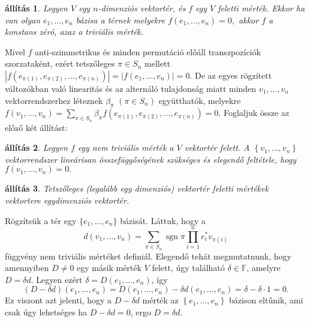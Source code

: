 \documentclass[9pt, a4paper, showtrims]{memoir}
\makeatletter
\renewenvironment{proof}[1][\proofname]
    {\par\pushQED{\qed}%
    \normalfont \topsep6\p@\@plus6\p@\relax
    \trivlist
    \item[\hskip\labelsep
        \itshape
    #1\@addpunct{:}]\ignorespaces}
    {\popQED\endtrivlist\@endpefalse}
\theoremstyle{plain}
\newtheorem{proposition}{állítás}[chapter]
\theoremstyle{remark}
\theoremstyle{definition}
\DeclareMathOperator{\sgn}{sgn}
\makeatother
\begin{document}
\begin{proposition}
	Legyen $V$ egy $n$-dimenziós vektortér, és $f$ egy $V$ feletti mérték.
	Ekkor ha van olyan $e_{1},\ldots ,e_{n}$ bázisa a térnek melyekre
	\(
	f\left( e_{1},\ldots ,e_{n}\right)
	=
	0,
	\)
	akkor $f$ a konstans zéró, azaz a triviális mérték.
\end{proposition}
\begin{proof}
	Mivel $f$ anti-szimmetrikus és minden permutáció előáll transzpozíciók szorzataként,
	ezért tetszőleges $\pi \in S_{n}$ mellett
	$\left| f\left(e_{\pi \left( 1\right) },e_{\pi \left( 2\right) },\ldots ,e_{\pi \left(n\right) }\right) \right|
		=
		\left| f\left( e_{1},\ldots ,e_{n}\right) \right|
		=
		0.
	$
	De az egyes rögzített változókban való linearitás és az alternáló tulajdonság miatt minden
	$v_{1},\ldots ,v_{n}$ vektorrendszerhez léteznek
	$\beta _{\pi }$ $\left( \pi \in S_{n}\right) $ együtthatók,
	melyekre
	$f\left(v_{1},\ldots ,v_{n}\right)
		=
		\sum_{\pi \in S_{n}}\beta _{\pi }f\left( e_{\pi\left( 1\right) },e_{\pi \left( 2\right) },\ldots ,e_{\pi \left( n\right)}\right)
		=
		0.$
\end{proof}
Foglaljuk össze az előző két állítást:
\begin{proposition}
	Legyen $f$ egy nem triviális mérték a $V$ vektortér felett. A
	\begin{math}
		\left\{ v_1,\ldots,v_n \right\}
	\end{math}
	vektorrendszer lineárisan összefüggőségének szükséges és elegendő feltétele,
	hogy
	\begin{math}
		f\left( v_1,\ldots,v_n \right)
		=
		0.
	\end{math}
\end{proposition}

\begin{proposition}
	Tetszőleges (legalább egy dimenziós) vektortér feletti mértékek vektortere egydimenziós vektortér.
\end{proposition}
\begin{proof}
	Rögzítsük a tér egy $\{e_{1},\ldots ,e_{n}\}$ bázisát.
	Láttuk, hogy a
	\[
		d\left(v_{1},\ldots ,v_{n}\right)
		=
		\sum_{\pi \in S_{n}}\sgn\pi\prod_{i=1}^ne_i^\ast v_{\pi\left( i\right)}
	\]
	függvény nem triviális mértéket definiál.
	Elegendő tehát megmutatnunk,
	hogy amennyiben $D\neq 0$ egy másik mérték $V$ felett,
	úgy található
	$\delta\in \mathbb{F}$,
	amelyre
	$D=\delta d.$
	Legyen ezért
	$\delta
		=
		D\left( e_{1},\ldots,e_{n}\right)
	$,
	így
	\[
		\left( D-\delta d \right)\left( e_1,\ldots,e_n \right)
		=
		D\left( e_{1},\ldots ,e_{n}\right) -\delta d\left(e_{1},\ldots ,e_{n}\right)
		=
		\delta-\delta\cdot 1
		=
		0.
	\]
	Ez viszont azt jelenti,
	hogy a $D-\delta d$ mérték az  $\left\{e_{1},\ldots ,e_{n}  \right\}$
	bázison eltűnik,
	ami csak úgy lehetséges ha
	$D-\delta d=0$,
	ergo
	\begin{math}
		D=\delta d.
	\end{math}
\end{proof}
\end{document}
